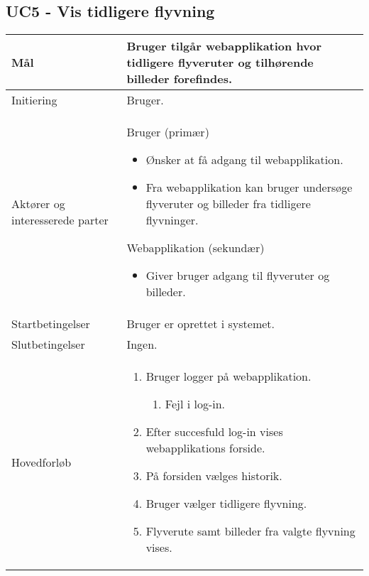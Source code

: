 \subsection*{UC5 - Vis tidligere flyvning}

\begin{table}[H]
\begin{tabular}{|l|p{10cm}|}
\hline

Mål	 								& Bruger tilgår webapplikation hvor tidligere flyveruter og tilhørende billeder forefindes. \\\hline
Initiering 							& Bruger. \\\hline
Aktører og interesserede parter			& Bruger (primær) 
										\begin{itemize}
											\item Ønsker at få adgang til webapplikation. 
											\item Fra webapplikation kan bruger undersøge flyveruter og billeder fra tidligere flyvninger.
										\end{itemize} 
									  Webapplikation (sekundær)
										\begin{itemize}
											\item Giver bruger adgang til flyveruter og billeder.
										\end{itemize} \\\hline
Startbetingelser							& Bruger er oprettet i systemet. \\\hline
Slutbetingelser						& Ingen. \\\hline
Hovedforløb				&
 
									\renewcommand{\labelenumi}{\arabic{enumi}.}
									\renewcommand{\labelenumii}{\Roman{enumii}:}

									\begin{enumerate}[topsep=0.0cm, leftmargin=0.5cm]
										\item Bruger logger på webapplikation.
										\begin{enumerate}[partopsep=4cm, topsep=0cm, leftmargin=1cm]
												\item Fejl i log-in.
										\end{enumerate}
										\item Efter succesfuld log-in vises webapplikations forside.
										\item På forsiden vælges historik.
										\item Bruger vælger tidligere flyvning.	
										\item Flyverute samt billeder fra valgte flyvning vises.
									\end{enumerate} \\\hline	


\end{tabular}
\end{table}
